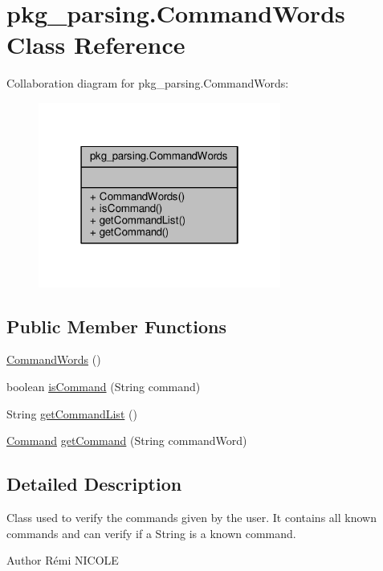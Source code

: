 \hypertarget{classpkg__parsing_1_1CommandWords}{\section{pkg\-\_\-parsing.\-Command\-Words Class Reference}
\label{classpkg__parsing_1_1CommandWords}
}


Collaboration diagram for pkg\-\_\-parsing.\-Command\-Words\-:
\nopagebreak
\begin{figure}[H]
\begin{center}
\leavevmode
\includegraphics[width=226pt]{classpkg__parsing_1_1CommandWords__coll__graph}
\end{center}
\end{figure}
\subsection*{Public Member Functions}
\begin{DoxyCompactItemize}
\item 
\hyperlink{classpkg__parsing_1_1CommandWords_ac01e3b4727e741eb8add2eef27c8f7b7}{Command\-Words} ()
\item 
boolean \hyperlink{classpkg__parsing_1_1CommandWords_ab02b508bb42cbda758afe6cee5794216}{is\-Command} (String command)
\item 
String \hyperlink{classpkg__parsing_1_1CommandWords_a55f01013b1d051547ee3fa6605ea4c14}{get\-Command\-List} ()
\item 
\hyperlink{classpkg__commands_1_1Command}{Command} \hyperlink{classpkg__parsing_1_1CommandWords_a244829164976aa9444b3b1e84462ac5c}{get\-Command} (String command\-Word)
\end{DoxyCompactItemize}


\subsection{Detailed Description}
Class used to verify the commands given by the user. It contains all known commands and can verify if a String is a known command. \begin{DoxyAuthor}{Author}
Rémi N\-I\-C\-O\-L\-E 
\end{DoxyAuthor}


